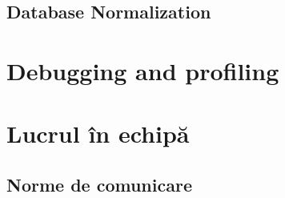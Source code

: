 \subsection{Database Normalization}



% 
% 
% 

\section{Debugging and profiling}

\section{Lucrul în echipă}
% 
% 
% 


\subsection{Norme de comunicare}

